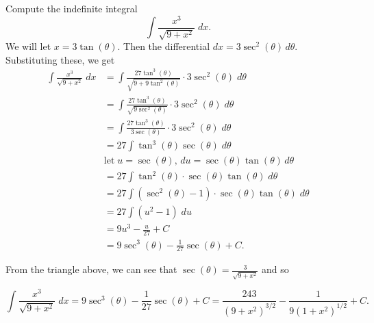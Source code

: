 \documentclass{ximera}
\begin{document}
\begin{example}
Compute the indefinite integral
\[
\int \frac{x^3}{\sqrt{9 + x^2}} \; dx.
\]
We will let $x = 3\tan(\theta)$. Then the differential
$dx = 3\sec^2(\theta) \, d\theta$.  Substituting these, we get
\begin{align*}
\int \frac{x^3}{\sqrt{9 + x^2}} \; dx &= \int \frac{27\tan^3(\theta)}{\sqrt{9 + 9\tan^2(\theta)}} \cdot 3\sec^2(\theta) \; d\theta\\
                                      &= \int \frac{27\tan^3(\theta)}{\sqrt{9\sec^2(\theta)}} \cdot 3\sec^2(\theta) \; d\theta\\
                                      &= \int \frac{27\tan^3(\theta)}{3\sec(\theta)} \cdot 3\sec^2(\theta) \; d\theta\\
                                      &= 27\int \tan^3(\theta) \sec(\theta) \; d\theta\\
                                      & \text{let} \; u = \sec(\theta), \, du = \sec(\theta) \tan(\theta) \, d\theta\\
                                      &= 27\int \tan^2(\theta) \cdot \sec(\theta) \tan(\theta) \; d\theta\\
                                      &= 27\int \left(\sec^2(\theta)-1\right) \cdot \sec(\theta) \tan(\theta) \; d\theta\\
                                      &= 27\int (u^2-1) \; du\\
                                      &= 9u^3 - \frac{u}{27} + C\\
                                      &= 9\sec^3(\theta) - \frac{1}{27} \sec(\theta) + C.
\end{align*}


From the triangle above, we can see that $\sec(\theta) = \frac{3}{\sqrt{9+x^2}}$ and so

\[
\int \frac{x^3}{\sqrt{9 + x^2}} \; dx = 9\sec^3(\theta) - \frac{1}{27} \sec(\theta) + C = \frac{243}{(9+x^2)^{3/2}} - \frac{1}{9(1+x^2)^{1/2}} + C.
\]
\end{example}
\end{document}

